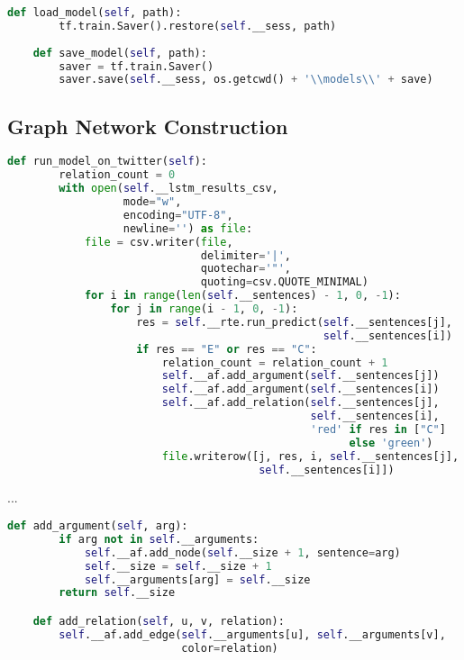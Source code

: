             \begin{lstlisting}[language=Python, caption=Saving and Loading Functions, label=code:lstmsaveload]
    def load_model(self, path):
        tf.train.Saver().restore(self.__sess, path)
        
    def save_model(self, path):
        saver = tf.train.Saver()
        saver.save(self.__sess, os.getcwd() + '\\models\\' + save)
            \end{lstlisting}
    
    \subsection{Graph Network Construction} \label{graphnetwork}
        
        \begin{lstlisting}[language=Python, caption=Constructing Directed Graph from Results, label=code:lstmdigraph]
    def run_model_on_twitter(self):
        relation_count = 0
        with open(self.__lstm_results_csv, 
                  mode="w", 
                  encoding="UTF-8", 
                  newline='') as file:
            file = csv.writer(file, 
                              delimiter='|', 
                              quotechar='"', 
                              quoting=csv.QUOTE_MINIMAL)
            for i in range(len(self.__sentences) - 1, 0, -1):
                for j in range(i - 1, 0, -1):
                    res = self.__rte.run_predict(self.__sentences[j], 
                                                 self.__sentences[i])
                    if res == "E" or res == "C":
                        relation_count = relation_count + 1
                        self.__af.add_argument(self.__sentences[j])
                        self.__af.add_argument(self.__sentences[i])
                        self.__af.add_relation(self.__sentences[j], 
                                               self.__sentences[i],
                                               'red' if res in ["C"] 
                                                     else 'green')
                        file.writerow([j, res, i, self.__sentences[j],
                                       self.__sentences[i]])
            \end{lstlisting}
            
            ...
            
            \begin{lstlisting}[language=Python, caption=Adding Arguments and Relations, label=code:addargrelation]
    def add_argument(self, arg):
        if arg not in self.__arguments:
            self.__af.add_node(self.__size + 1, sentence=arg)
            self.__size = self.__size + 1
            self.__arguments[arg] = self.__size
        return self.__size

    def add_relation(self, u, v, relation):
        self.__af.add_edge(self.__arguments[u], self.__arguments[v], 
                           color=relation)
            \end{lstlisting}
            
